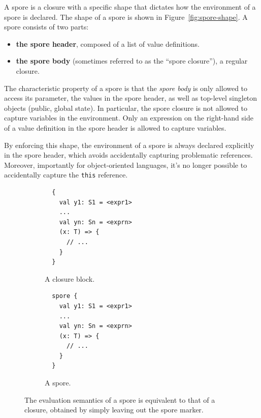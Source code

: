 \documentclass{easychair}
\begin{document}
A spore is a closure with a specific shape that dictates how the environment
of a spore is declared. The shape of a spore is shown in Figure~\ref{fig:spore-shape}.
A spore consists of two parts:
\begin{itemize}
\item {\bf the spore header}, composed of a list of value definitions.
\item {\bf the spore body} (sometimes referred to as the ``spore closure''), a regular closure.
\end{itemize}


The characteristic property
of a spore is that the {\em spore body} is only allowed to access its
parameter, the values in the spore header, as well as top-level singleton objects
(public, global state). In particular, the spore closure is not allowed to
capture variables in the environment. Only an expression on the right-hand
side of a value definition in the spore header is allowed to capture
variables.

By enforcing this shape, the environment of a spore is always declared
explicitly in the spore header, which avoids accidentally capturing
problematic references. Moreover, importantly for object-oriented languages, it's no
longer possible to accidentally capture the \verb|this| reference.

\begin{figure}%
\begin{subfigure}{.5\textwidth}
  \centering
  \begin{lstlisting}
  {
    val y1: S1 = <expr1>
    ...
    val yn: Sn = <exprn>
    (x: T) => {
      // ...
    }
  }
  \end{lstlisting}
  \caption{A closure block.}
  \label{fig:normal-block}
\end{subfigure}%
\begin{subfigure}{.5\textwidth}
  \centering
  \begin{lstlisting}
  spore {
    val y1: S1 = <expr1>
    ...
    val yn: Sn = <exprn>
    (x: T) => {
      // ...
    }
  }
  \end{lstlisting}
  \caption{A spore.}
  \label{fig:normal-spore-shape}
\end{subfigure}%
\vspace{1mm}
\caption{The evaluation semantics of a spore is equivalent to that of a closure, obtained by simply leaving out the spore marker.}
\label{fig:evaluation-semantics}
\end{figure}
\end{document}
